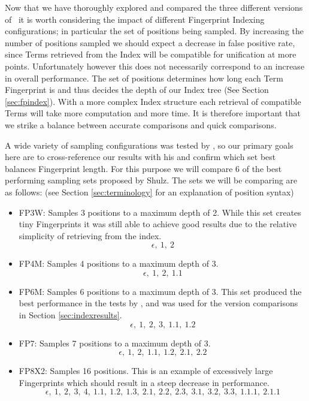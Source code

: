 Now that we have thoroughly explored and compared the three different versions of
\beagle\ it is worth considering the impact of different Fingerprint Indexing
configurations; in particular the set of positions being sampled. 
By increasing the number of positions sampled we should
expect a decrease in false positive rate, since Terms retrieved from the Index will
be compatible for unification at more points. Unfortunately however this does
not necessarily correspond to an increase in overall performance.
The set of positions determines how long each Term Fingerprint is and thus decides the depth of our Index
tree (See Section \ref{sec:fpindex}). With a more complex Index structure each
retrieval of compatible Terms will take more computation and more time. It is
therefore important that we strike a balance between accurate comparisons and
quick comparisons.

\pagebreak

A wide variety
of sampling configurations was tested by , so our primary goals
here are to cross-reference our results with his and confirm which set best balances Fingerprint length.
For this purpose we will compare 6 of the best performing sampling sets proposed by
Shulz. The sets we will be comparing are as follows: (see Section \ref{sec:terminology}
for an explanation of position syntax)

  \begin{itemize}
  \item FP3W: Samples 3 positions to a maximum depth of 2. While this set creates
  tiny Fingerprints it was still able to achieve good results due to the relative simplicity
  of retrieving from the index. \cite{shulz12}
  \[\epsilon,\  1,\  2\]
  \item FP4M: Samples 4 positions to a maximum depth of 3.
  \[\epsilon,\  1,\  2,\  1.1\]
  \item FP6M: Samples 6 positions to a maximum depth of 3. This set produced the
  best performance in the tests by , and was used for the version
  comparisons in Section \ref{sec:indexresults}.
  \[\epsilon,\  1,\  2,\  3,\  1.1,\  1.2\]
  \item FP7: Samples 7 positions to a maximum depth of 3.
  \[\epsilon,\  1,\  2,\  1.1,\  1.2,\  2.1,\  2.2\]
  \item FP8X2: Samples 16 positions. This is an example of excessively large Fingerprints
  which should result in a steep decrease in performance.
  \[\epsilon,\  1,\  2,\  3,\  4,\  1.1,\  1.2,\  1.3,\  2.1,\  2.2,\  2.3,\  3.1,\  3.2,\  3.3,\  1.1.1,\  2.1.1\]
  \end{itemize}


